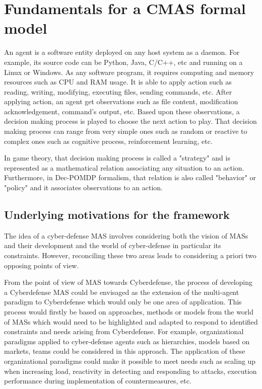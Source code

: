 \documentclass[conference]{IEEEtran}
\begin{document}
\section{Fundamentals for a CMAS formal model}

An agent is a software entity deployed on any host system as a daemon.
For example, its source code can be Python, Java, C/C++, etc and running on a Linux or Windows.
As any software program, it requires computing and memory resources such as CPU and RAM usage.
It is able to apply action such as reading, writing, modifying, executing files, sending commands, etc.
After applying action, an agent get observations such as file content, modification acknowledgement, command's output, etc.
Based upon these observations, a decision making process is played to choose the next action to play. That decision making process can range from very simple ones such as random or reactive to complex ones such as cognitive process, reinforcement learning, etc.

In game theory, that decision making process is called a "strategy" and is represented as a mathematical relation associating any situation to an action.
Furthermore, in Dec-POMDP formalism, that relation is also called "behavior" or "policy" and it associates observations to an action.

\subsection{Underlying motivations for the framework}

The idea of a cyber-defense MAS involves considering both the vision of MASs and their development and the world of cyber-defense in particular its constraints. However, reconciling these two areas leads to considering a priori two opposing points of view.

From the point of view of MAS towards Cyberdefense, the process of developing a Cyberdefense MAS could be envisaged as the extension of the multi-agent paradigm to Cyberdefense which would only be one area of application. This process would firstly be based on approaches, methods or models from the world of MASs which would need to be highlighted and adapted to respond to identified constraints and needs arising from Cyberdefense. For example, organizational paradigms applied to cyber-defense agents such as hierarchies, models based on markets, teams could be considered in this approach. The application of these organizational paradigms could make it possible to meet needs such as scaling up when increasing load, reactivity in detecting and responding to attacks, execution performance during implementation of countermeasures, etc.
\end{document}
